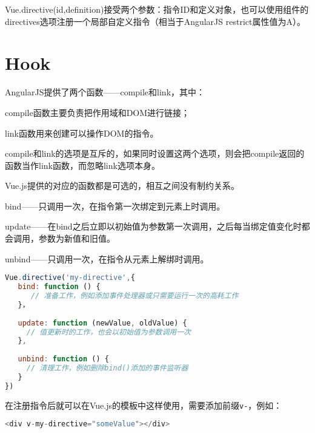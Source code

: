 Vue.directive(id,definition)接受两个参数：指令ID和定义对象，也可以使用组件的directives选项注册一个局部自定义指令（相当于AngularJS restrict属性值为A）。


\section{Hook}

AngularJS提供了两个函数——compile和link，其中：

\begin{compactitem}
\item compile函数主要负责把作用域和DOM进行链接；
\item link函数用来创建可以操作DOM的指令。
\end{compactitem}

compile和link的选项是互斥的，如果同时设置这两个选项，则会把compile返回的函数当作link函数，而忽略link选项本身。

Vue.js提供的对应的函数都是可选的，相互之间没有制约关系。

\begin{compactitem}
\item bind——只调用一次，在指令第一次绑定到元素上时调用。


\item update——在bind之后立即以初始值为参数第一次调用，之后每当绑定值变化时都会调用，参数为新值和旧值。


\item unbind——只调用一次，在指令从元素上解绑时调用。

\end{compactitem}



\begin{lstlisting}[language=JavaScript]
Vue.directive('my-directive',{
   bind: function () {
      // 准备工作，例如添加事件处理器或只需要运行一次的高耗工作
   }，
   
   update: function (newValue, oldValue) {
     // 值更新时的工作，也会以初始值为参数调用一次
   },
   
   unbind: function () {
     // 清理工作，例如删除bind()添加的事件监听器
   }
})
\end{lstlisting}


在注册指令后就可以在Vue.js的模板中这样使用，需要添加前缀\texttt{v-}，例如：


\begin{lstlisting}[language=JavaScript]
<div v-my-directive="someValue"></div>
\end{lstlisting}

